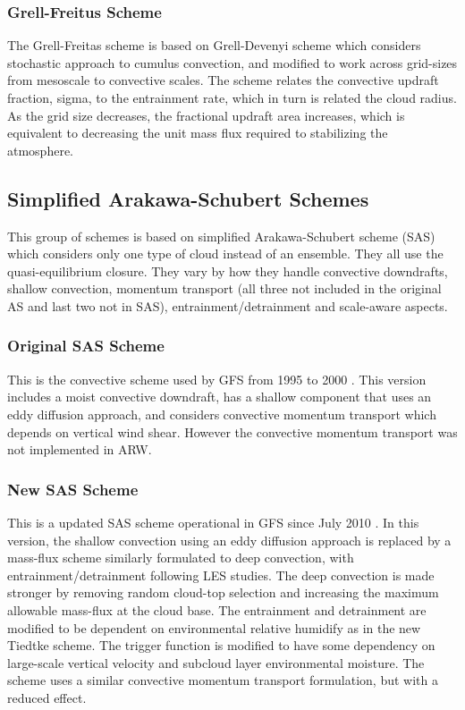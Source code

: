 \subsubsection{Grell-Freitus Scheme}

The Grell-Freitas scheme \citep{grell14} is based on Grell-Devenyi 
scheme which considers stochastic approach to cumulus convection, and modified 
to work across grid-sizes from mesoscale to convective scales. The scheme 
relates the convective updraft fraction, sigma, to the entrainment rate, 
which in turn is related the cloud radius. As the grid size decreases, the 
fractional updraft area increases, which is equivalent to decreasing 
the unit mass flux required to stabilizing the atmosphere.

\subsection{Simplified Arakawa-Schubert Schemes}

This group of schemes is based on simplified Arakawa-Schubert scheme (SAS) \citep{grell93} 
which considers only one type of cloud instead of an ensemble. They all use the 
quasi-equilibrium closure. They vary by how they handle convective downdrafts, 
shallow convection, momentum transport (all three not included in the original 
AS and last two not in SAS), entrainment/detrainment and scale-aware aspects.

\subsubsection{Original SAS Scheme}

This is the convective scheme used by GFS from 1995 to 2000 \citep{pan95}. This version 
includes a moist convective downdraft, has a shallow component that uses an 
eddy diffusion approach, and considers convective momentum transport which 
depends on vertical wind shear. However the convective momentum transport 
was not implemented in ARW. 

\subsubsection{New SAS Scheme}

This is a updated SAS scheme operational in GFS since July 2010 \citep{han11}. In this version, 
the shallow convection using an eddy diffusion approach is replaced by a mass-flux 
scheme similarly formulated to deep convection, with entrainment/detrainment 
following LES studies. The deep convection is made stronger by removing random 
cloud-top selection and increasing the maximum allowable mass-flux at the cloud base. 
The entrainment and detrainment are modified to be dependent on environmental relative 
humidify as in the new Tiedtke scheme. The trigger function is modified to have some 
dependency on large-scale vertical velocity and subcloud layer environmental moisture. 
The scheme uses a similar convective momentum transport formulation, but with a reduced effect.

